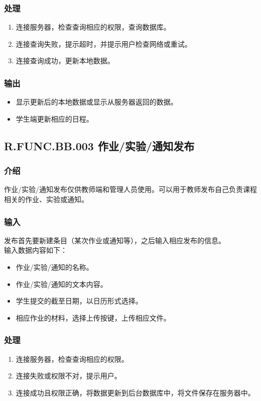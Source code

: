       \subsubsection{处理}
      \begin{enumerate}
        \item 连接服务器，检查查询相应的权限，查询数据库。
        \item 连接查询失败，提示超时，并提示用户检查网络或重试。
        \item 连接查询成功，更新本地数据。
      \end{enumerate}
      \subsubsection{输出}
      \begin{itemize}
        \item 显示更新后的本地数据或显示从服务器返回的数据。
        \item 学生端更新相应的日程。
      \end{itemize}

    \subsection{R.FUNC.BB.003 作业/实验/通知发布}
      \subsubsection{介绍}
      作业/实验/通知发布仅供教师端和管理人员使用。可以用于教师发布自己负责课程相关的作业、实验或通知。
      \subsubsection{输入}
      发布首先要新建条目（某次作业或通知等），之后输入相应发布的信息。\\
      输入数据内容如下：
      \begin{itemize}
        \item 作业/实验/通知的名称。
        \item 作业/实验/通知的文本内容。
        \item 学生提交的截至日期，以日历形式选择。
        \item 相应作业的材料，选择上传按键，上传相应文件。
      \end{itemize}
      \subsubsection{处理}
      \begin{enumerate}
        \item 连接服务器，检查查询相应的权限。
        \item 连接失败或权限不对，提示用户。
        \item 连接成功且权限正确，将数据更新到后台数据库中，将文件保存在服务器中。
      \end{enumerate}
